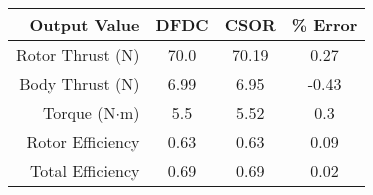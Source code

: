         \begin{tabular}{ r | c | c | c }
            Output Value & DFDC & CSOR & \% Error \\
            \hline
            Rotor Thrust (N) & 70.0 & 70.19 & 0.27 \\
            Body Thrust (N) & 6.99 & 6.95 & -0.43 \\
            Torque (N\(\cdot\)m) & 5.5 & 5.52 & 0.3 \\
            Rotor Efficiency & 0.63 & 0.63 & 0.09 \\
            Total Efficiency & 0.69 & 0.69 & 0.02 \\
        \end{tabular}
